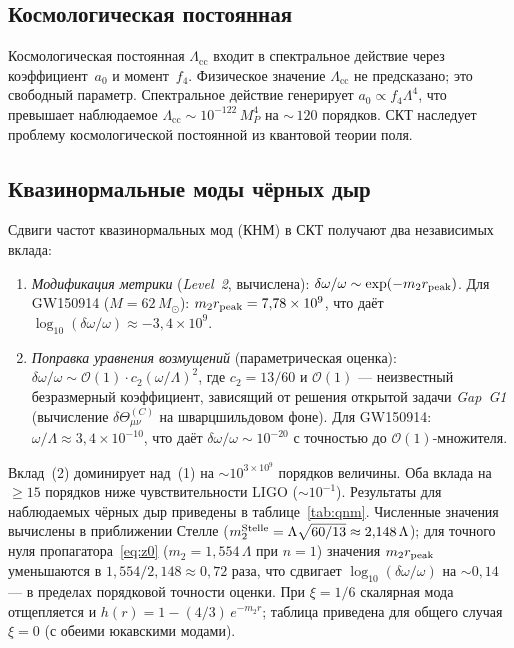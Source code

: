 \documentclass[12pt,a4paper]{article}
\theoremstyle{plain}
\theoremstyle{definition}
\theoremstyle{remark}
\newcommand{\order}{\mathcal{O}}
\begin{document}
\subsection{Космологическая постоянная}
\label{sec:cc}

Космологическая постоянная $\Lambda_{\mathrm{cc}}$ входит в
спектральное действие через коэффициент~$a_0$ и момент~$f_4$.
Физическое значение $\Lambda_{\mathrm{cc}}$ не предсказано; это
свободный параметр. Спектральное действие генерирует
$a_0 \propto f_4 \Lambda^4$, что превышает наблюдаемое
$\Lambda_{\mathrm{cc}} \sim 10^{-122}\, M_P^4$ на
${\sim}\,120$ порядков. СКТ наследует проблему космологической
постоянной из квантовой теории поля.

\subsection{Квазинормальные моды чёрных дыр}
\label{sec:qnm}

Сдвиги частот квазинормальных мод (КНМ) в СКТ получают два
независимых вклада:
\begin{enumerate}
\item \emph{Модификация метрики} (\textit{Level~2}, вычислена):
  $\delta\omega/\omega \sim \exp(-m_2 r_{\rm peak})$.
  Для GW150914 ($M = 62\,M_\odot$): $m_2 r_{\rm peak} = 7{,}78 \times 10^9$,
  что даёт $\log_{10}(\delta\omega/\omega) \approx -3{,}4 \times 10^9$.
\item \emph{Поправка уравнения возмущений} (параметрическая оценка):
  $\delta\omega/\omega \sim \order(1) \cdot c_2(\omega/\Lambda)^2$,
  где $c_2 = 13/60$ и $\order(1)$ --- неизвестный безразмерный
  коэффициент, зависящий от решения открытой задачи \textit{Gap~G1}
  (вычисление $\delta\Theta^{(C)}_{\mu\nu}$ на шварцшильдовом
  фоне). Для GW150914: $\omega/\Lambda \approx 3{,}4 \times 10^{-10}$,
  что даёт $\delta\omega/\omega \sim 10^{-20}$ с точностью до
  $\order(1)$-множителя.
\end{enumerate}
Вклад~(2) доминирует над~(1) на $\sim 10^{3 \times 10^9}$ порядков
величины. Оба вклада на $\geq 15$ порядков ниже чувствительности LIGO
($\sim 10^{-1}$). Результаты для наблюдаемых чёрных дыр приведены
в таблице~\ref{tab:qnm}. Численные значения вычислены в
приближении Стелле ($m_2^{\rm Stelle} = \Lambda\sqrt{60/13}
\approx 2{,}148\,\Lambda$); для точного нуля
пропагатора~\eqref{eq:z0} ($m_2 = 1{,}554\,\Lambda$ при $n=1$)
значения $m_2 r_{\rm peak}$ уменьшаются в $1{,}554/2{,}148
\approx 0{,}72$ раза, что сдвигает $\log_{10}(\delta\omega/\omega)$
на $\sim 0{,}14$ --- в пределах порядковой точности оценки.
При $\xi = 1/6$ скалярная мода отщепляется и $h(r) = 1 - (4/3)\,e^{-m_2 r}$;
таблица приведена для общего случая $\xi = 0$ (с обеими юкавскими
модами).
\end{document}
